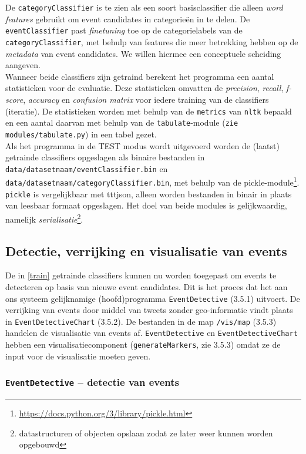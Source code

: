 \documentclass[a4paper,10pt,titlepage]{article}
\def\vl{\\[9pt]}                              %
\def\ss{\subsection}                          %
\def\sss{\subsubsection}                      %
\def\ttt{\texttt}                             %
\def\it{\textit}                              %
\begin{document}
{{De \ttt{categoryClassifier} is te zien als een soort basisclassifier die alleen \it{word 
features} gebruikt om event candidates in categorie\"en in te delen. De 
\ttt{eventClassifier} past \it{finetuning} toe op de categorielabels van de 
\ttt{categoryClassifier}, met behulp van features die meer betrekking hebben op de 
\it{metadata} van event candidates. We willen hiermee een conceptuele scheiding aangeven.
\vl
Wanneer beide classifiers zijn getraind berekent het programma een aantal 
statistieken voor de evaluatie. Deze statistieken omvatten de \it{precision}, \it{recall}, 
\it{f-score}, \it{accuracy} en \it{confusion matrix} voor iedere training van de classifiers 
(iteratie). De statistieken worden met behulp van de \ttt{metrics} van \ttt{nltk} bepaald en 
een aantal daarvan met behulp van de \ttt{tabulate}-module (\ttt{zie modules/tabulate.py}) 
in een tabel gezet.
\vl
Als het programma in de TEST modus wordt uitgevoerd worden de (laatst) getrainde 
classifiers opgeslagen als binaire bestanden in 
\ttt{data/datasetnaam/eventClassifier.bin} en \ttt{data/da\-ta\-set\-naam/categoryClassifier.bin}, 
met behulp van de pickle-module\footnote{\url{https://docs.python.org/3/library/pickle.html}}.
\ttt{pickle} is vergelijkbaar met ttt{json}, alleen worden bestanden in binair in plaats van
leesbaar formaat opgeslagen. Het doel van beide modules is gelijkwaardig, namelijk
\it{serialisatie}\footnote{datastructuren of objecten opslaan zodat ze later weer kunnen 
worden opgebouwd}.

\ss{Detectie, verrijking en visualisatie van events}

De in \ref{train} getrainde classifiers kunnen nu worden toegepast om events te 
detecteren op basis van nieuwe event candidates. Dit is het proces dat het aan 
ons systeem gelijknamige (hoofd)programma \ttt{EventDetective} (3.5.1) uitvoert. De 
verrijking van events door middel van tweets zonder geo-informatie vindt plaats 
in \ttt{EventDetectiveChart} (3.5.2). De bestanden in de map \ttt{/vis/map} (3.5.3) handelen 
de visualisatie van events af. \ttt{EventDetective} en \ttt{EventDetectiveChart} hebben een 
visualisatiecomponent (\ttt{generateMarkers}, zie 3.5.3) omdat ze de input voor de 
visualisatie moeten geven.

\sss{\ttt{EventDetective} – detectie van events}\label{EventDetective}

}}
\end{document}
